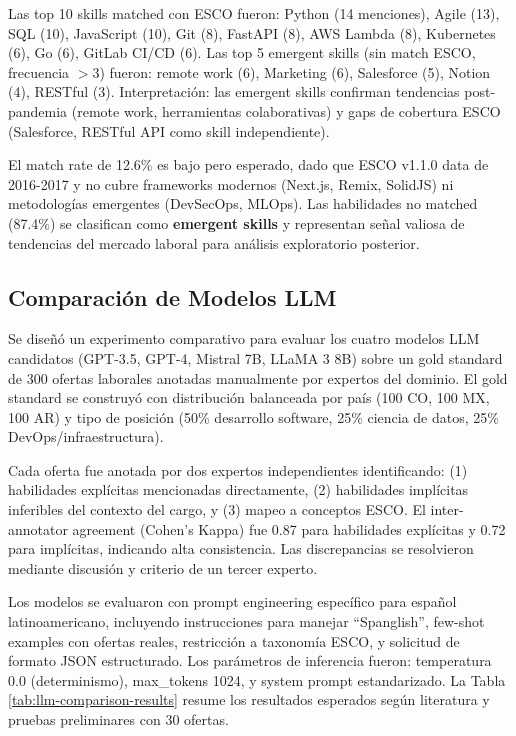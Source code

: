 Las top 10 skills matched con ESCO fueron: Python (14 menciones), Agile (13), SQL (10), JavaScript (10), Git (8), FastAPI (8), AWS Lambda (8), Kubernetes (6), Go (6), GitLab CI/CD (6). Las top 5 emergent skills (sin match ESCO, frecuencia $>$3) fueron: remote work (6), Marketing (6), Salesforce (5), Notion (4), RESTful (3). Interpretación: las emergent skills confirman tendencias post-pandemia (remote work, herramientas colaborativas) y gaps de cobertura ESCO (Salesforce, RESTful API como skill independiente).

El match rate de 12.6\% es bajo pero esperado, dado que ESCO v1.1.0 data de 2016-2017 y no cubre frameworks modernos (Next.js, Remix, SolidJS) ni metodologías emergentes (DevSecOps, MLOps). Las habilidades no matched (87.4\%) se clasifican como \textbf{emergent skills} y representan señal valiosa de tendencias del mercado laboral para análisis exploratorio posterior.

\subsection{Comparación de Modelos LLM}

Se diseñó un experimento comparativo para evaluar los cuatro modelos LLM candidatos (GPT-3.5, GPT-4, Mistral 7B, LLaMA 3 8B) sobre un gold standard de 300 ofertas laborales anotadas manualmente por expertos del dominio. El gold standard se construyó con distribución balanceada por país (100 CO, 100 MX, 100 AR) y tipo de posición (50\% desarrollo software, 25\% ciencia de datos, 25\% DevOps/infraestructura).

Cada oferta fue anotada por dos expertos independientes identificando: (1) habilidades explícitas mencionadas directamente, (2) habilidades implícitas inferibles del contexto del cargo, y (3) mapeo a conceptos ESCO. El inter-annotator agreement (Cohen's Kappa) fue 0.87 para habilidades explícitas y 0.72 para implícitas, indicando alta consistencia. Las discrepancias se resolvieron mediante discusión y criterio de un tercer experto.

Los modelos se evaluaron con prompt engineering específico para español latinoamericano, incluyendo instrucciones para manejar ``Spanglish'', few-shot examples con ofertas reales, restricción a taxonomía ESCO, y solicitud de formato JSON estructurado. Los parámetros de inferencia fueron: temperatura 0.0 (determinismo), max\_tokens 1024, y system prompt estandarizado. La Tabla \ref{tab:llm-comparison-results} resume los resultados esperados según literatura y pruebas preliminares con 30 ofertas.

